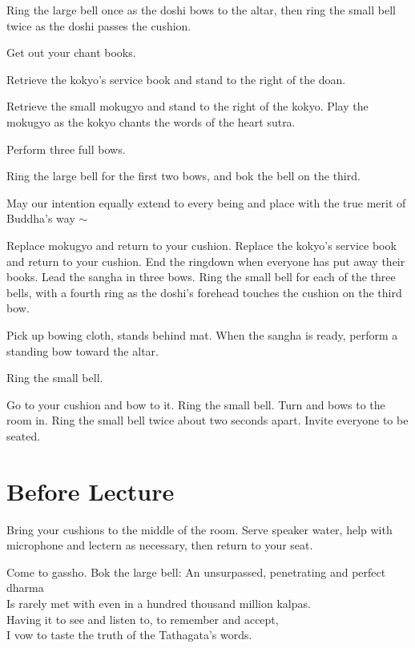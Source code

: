 \documentclass{chantbook}
\begin{document}
\doan Ring the large bell once as the doshi bows to the altar, then ring the
small bell twice as the doshi passes the cushion.
\takeOutChantBookBells

\sangha Get out your chant books.

\kokyo Retrieve the kokyo's service book and stand to the right of the doan.

\tenken Retrieve the small mokugyo and stand to the right of the kokyo. Play the
mokugyo as the kokyo chants the words of the heart sutra.

\doshi Perform three full bows.

\doan Ring the large bell for the first two bows, and bok the bell on the
third.
\secondBows

\kokyo \heartOfGreatPerfectWisdomSutra

\kokyo May our intention equally extend to every being and place with the true
merit of Buddha's way $\sim$ \largebell

\allBuddhas

\smallBellRolldown

\tenken Replace mokugyo and return to your cushion.
\kokyo Replace the kokyo's service book and return to your cushion.
\doan End the ringdown when everyone has put away their books.
\doshi Lead the sangha in three bows.
\doan Ring the small bell for each of the three bells, with a fourth ring as
the doshi's forehead touches the cushion on the third bow.
\lastBows

\doshi Pick up bowing cloth, stands behind mat. When the sangha is ready,
perform a standing bow toward the altar.

\doan Ring the small bell. \bigspace\smallbell

\doshi Go to your cushion and bow to it.
\doan Ring the small bell. \bigspace\smallbell
\doshi Turn and bows to the room in.
\doan Ring the small bell twice about two seconds apart.
\beSeatedBells
\doshi Invite everyone to be seated.

\section*{Before Lecture}
\sangha Bring your cushions to the middle of the room.
\kokyo Serve speaker water, help with microphone and lectern as necessary,
then return to your seat.

\doshi Come to gassho.
\doan Bok the large bell: \bigspace\bok
\sangha An unsurpassed, penetrating and perfect dharma\\
Is rarely met with even in a hundred thousand million kalpas.\\
Having it to see and listen to, to remember and accept,\\
I vow to taste the truth of the Tathagata's words.
\end{document}
